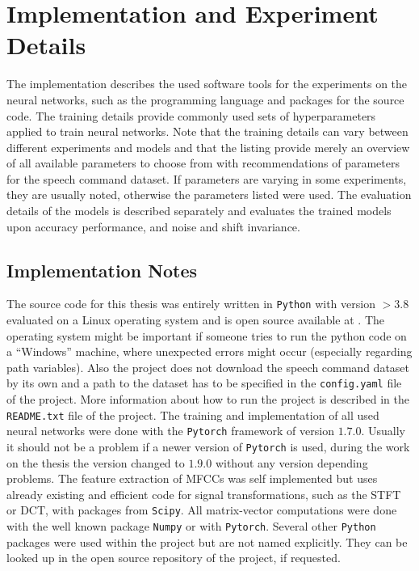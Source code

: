 
\section{Implementation and Experiment Details}\label{sec:exp_details}
The implementation describes the used software tools for the experiments on the neural networks, such as the programming language and packages for the source code.
The training details provide commonly used sets of hyperparameters applied to train neural networks.
Note that the training details can vary between different experiments and models and that the listing provide merely an overview of all available parameters to choose from with recommendations of parameters for the speech command dataset.
If parameters are varying in some experiments, they are usually noted, otherwise the parameters listed were used.
The evaluation details of the models is described separately and evaluates the trained models upon accuracy performance, and noise and shift invariance.



\subsection{Implementation Notes}\label{sec:exp_details_implementation}
The source code for this thesis was entirely written in \texttt{Python} with version $>3.8$ evaluated on a Linux operating system and is open source available at \cite{KWSGame}.
The operating system might be important if someone tries to run the python code on a \enquote{Windows} machine, where unexpected errors might occur (especially regarding path variables).
Also the project does not download the speech command dataset by its own and a path to the dataset has to be specified in the \texttt{config.yaml} file of the project.
More information about how to run the project is described in the \texttt{README.txt} file of the project.
The training and implementation of all used neural networks were done with the \texttt{Pytorch} \cite{Pytorch} framework of version $1.7.0$. 
Usually it should not be a problem if a newer version of \texttt{Pytorch} is used, during the work on the thesis the version changed to $1.9.0$ without any version depending problems.
The feature extraction of MFCCs was self implemented but uses already existing and efficient code for signal transformations, such as the STFT or DCT, with packages from \texttt{Scipy}.
All matrix-vector computations were done with the well known package \texttt{Numpy} or with \texttt{Pytorch}.
Several other \texttt{Python} packages were used within the project but are not named explicitly.
They can be looked up in the open source repository of the project, if requested.


